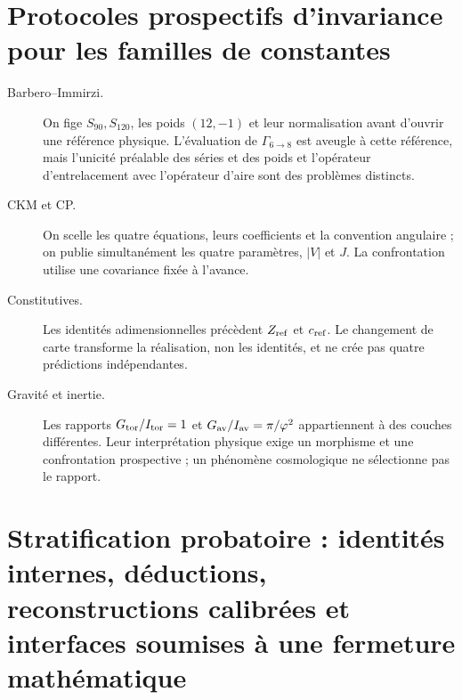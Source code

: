 \section{Protocoles prospectifs d'invariance pour les familles de constantes}
\label{sec:protocolos-prospectivos-especificos}

\begin{description}
 \item[Barbero--Immirzi.] On fige \(S_{90},S_{120}\), les poids
 \((12,-1)\) et leur normalisation avant d'ouvrir une référence physique.
 L'évaluation de \(\Gamma_{6\to8}\) est aveugle à cette référence,
 mais l'unicité préalable des séries et des poids et l'opérateur d'entrelacement avec l'opérateur
 d'aire sont des problèmes distincts.
 \item[CKM et CP.] On scelle les quatre équations, leurs coefficients et la
 convention angulaire ; on publie simultanément les quatre paramètres,
 \(|V|\) et \(J\). La confrontation utilise une covariance fixée à l'avance.
 \item[Constitutives.] Les identités adimensionnelles précèdent
 \(Z_{\rm ref}\) et \(c_{\rm ref}\). Le changement de carte transforme la
 réalisation, non les identités, et ne crée pas quatre prédictions
 indépendantes.
 \item[Gravité et inertie.] Les rapports
 \(G_{\rm tor}/I_{\rm tor}=1\) et
 \(G_{\rm av}/I_{\rm av}=\pi/\varphi^2\) appartiennent à des couches différentes.
 Leur interprétation physique exige un morphisme et une confrontation prospective ; un
 phénomène cosmologique ne sélectionne pas le rapport.
\end{description}

\section{Stratification probatoire : identités internes, déductions, reconstructions calibrées et interfaces soumises à une fermeture mathématique}
\label{sec:cinco-niveles-independencia}

